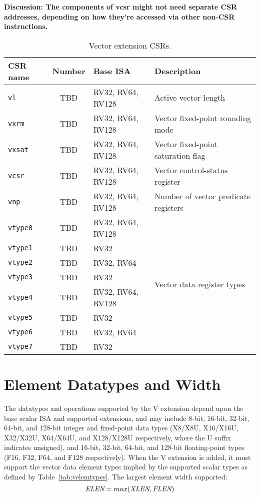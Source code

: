 \begin{commentary}
{\bf Discussion: The components of vcsr might not need separate CSR
  addresses, depending on how they're accessed via other non-CSR
  instructions.}
\end{commentary}

\begin{table}
  \centering
  \begin{tabular}{|l|c|l|l|}
    \hline
    CSR name & Number & Base ISA & Description\\
    \hline
    {\tt vl}    & TBD & RV32, RV64, RV128 & Active vector length\\
    {\tt vxrm}  & TBD & RV32, RV64, RV128 & Vector fixed-point rounding mode\\
    {\tt vxsat} & TBD & RV32, RV64, RV128 & Vector fixed-point saturation flag \\
    {\tt vcsr}  & TBD & RV32, RV64, RV128 & Vector control-status register\\
    \hline
    {\tt vnp} & TBD & RV32, RV64, RV128 & Number of vector predicate registers\\
    \hline
    {\tt vtype0} & TBD & RV32, RV64, RV128 & \multirow{8}{*}{Vector data register types}\\
    {\tt vtype1} & TBD & RV32 &\\
    {\tt vtype2} & TBD & RV32, RV64 &\\
    {\tt vtype3} & TBD & RV32 &\\
    {\tt vtype4}  & TBD & RV32, RV64, RV128 &\\
    {\tt vtype5} & TBD & RV32 &\\
    {\tt vtype6} & TBD & RV32, RV64 &\\
    {\tt vtype7} & TBD & RV32 &\\
    \hline
  \end{tabular}
  \caption{Vector extension CSRs.}
  \label{tab:vcsrs}
\end{table}

\section{Element Datatypes and Width}

The datatypes and operations supported by the V extension depend upon
the base scalar ISA and supported extensions, and may include 8-bit,
16-bit, 32-bit, 64-bit, and 128-bit integer and fixed-point data types
(X8/X8U, X16/X16U, X32/X32U, X64/X64U, and X128/X128U respectively,
where the U suffix indicates unsigned), and 16-bit, 32-bit, 64-bit,
and 128-bit floating-point types (F16, F32, F64, and F128
respectively).  When the V extension is added, it must support the
vector data element types implied by the supported scalar types as
defined by Table~\ref{tab:velemtypes}.  The largest element width
supported:
\[ \mbox{\em ELEN} = max(\mbox{\em XLEN}, \mbox{\em FLEN}) \]

